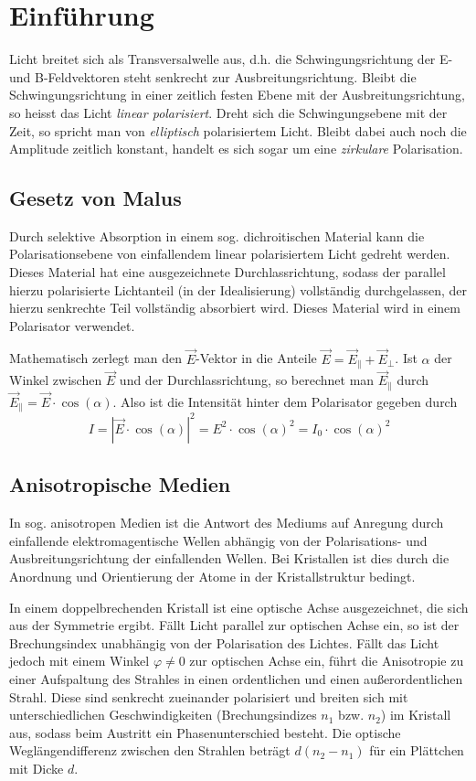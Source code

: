 \section{Einführung}
Licht breitet sich als Transversalwelle aus, d.h. die Schwingungsrichtung der E- und B-Feldvektoren steht senkrecht zur Ausbreitungsrichtung. Bleibt die Schwingungsrichtung in einer zeitlich festen Ebene mit der Ausbreitungsrichtung, so heisst das Licht \emph{linear polarisiert}. Dreht sich die Schwingungsebene mit der Zeit, so spricht man von \emph{elliptisch} polarisiertem Licht. Bleibt dabei auch noch die Amplitude zeitlich konstant, handelt es sich sogar um eine \emph{zirkulare} Polarisation.

\subsection{Gesetz von Malus}
Durch selektive Absorption in einem sog. dichroitischen Material kann die Polarisationsebene von einfallendem linear polarisiertem Licht gedreht werden. Dieses Material hat eine ausgezeichnete Durchlassrichtung, sodass der parallel hierzu polarisierte Lichtanteil (in der Idealisierung) vollständig durchgelassen, der hierzu senkrechte Teil vollständig absorbiert wird. Dieses Material wird in einem Polarisator verwendet.

Mathematisch zerlegt man den $\vec{E}$-Vektor in die Anteile $\vec{E}=\vec{E}_\parallel + \vec{E}_\perp$. Ist $\alpha$ der Winkel zwischen $\vec{E}$ und der Durchlassrichtung, so berechnet man $\vec{E}_\parallel$ durch $\vec{E}_\parallel=\vec{E}\cdot \cos(\alpha)$. Also ist die Intensität hinter dem Polarisator gegeben durch
\begin{equation}
	I=|\vec{E}\cdot\cos(\alpha)|^2=E^2\cdot\cos(\alpha)^2=I_0\cdot\cos(\alpha)^2
	\label{eq:malus}
\end{equation}

\subsection{Anisotropische Medien}
In sog. anisotropen Medien ist die Antwort des Mediums auf Anregung durch einfallende elektromagentische Wellen abhängig von der Polarisations- und Ausbreitungsrichtung der einfallenden Wellen. Bei Kristallen ist dies durch die Anordnung und Orientierung der Atome in der Kristallstruktur bedingt.

In einem doppelbrechenden Kristall ist eine optische Achse ausgezeichnet, die sich aus der Symmetrie ergibt. Fällt Licht parallel zur optischen Achse ein, so ist der Brechungsindex unabhängig von der Polarisation des Lichtes. Fällt das Licht jedoch mit einem Winkel $\varphi\neq 0$ zur optischen Achse ein, führt die Anisotropie zu einer Aufspaltung des Strahles in einen ordentlichen und einen außerordentlichen Strahl. Diese sind senkrecht zueinander polarisiert und breiten sich mit unterschiedlichen Geschwindigkeiten (Brechungsindizes $n_1$ bzw. $n_2$) im Kristall aus, sodass beim Austritt ein Phasenunterschied besteht. Die optische Weglängendifferenz zwischen den Strahlen beträgt $d(n_2-n_1)$ für ein Plättchen mit Dicke $d$.


